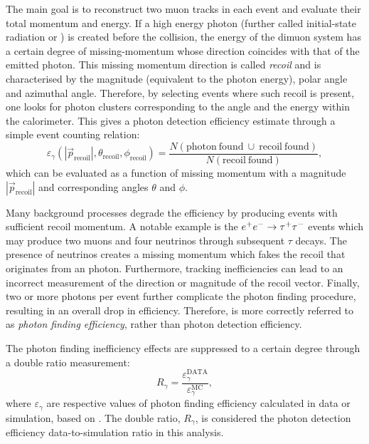 The main goal is to reconstruct two muon tracks in each event and evaluate their total momentum and energy.
If a high energy photon (further called initial-state radiation or \ISR) is created before the collision, the energy of the dimuon system has a certain degree of missing-momentum whose direction coincides with that of the emitted photon.
This missing momentum direction is called \textit{recoil} and is characterised by the magnitude (equivalent to the photon energy), polar angle and azimuthal angle.
Therefore, by selecting events where such recoil is present, one looks for photon clusters corresponding to the angle and the energy within the calorimeter.
This gives a photon detection efficiency estimate through a simple event counting relation:
\begin{equation}\label{eq:photon_efficiency}
    \varepsilon_{\gamma}(|\vec{p}_{\mathrm{recoil}}|, \theta_{\mathrm{recoil}}, \phi_{\mathrm{recoil}}) = \frac{N(\mathrm{photon~found}~\cup~\mathrm{recoil~found})}{N(\mathrm{recoil~found})},
\end{equation}
which can be evaluated as a function of missing momentum with a magnitude $|\vec{p}_{\mathrm{recoil}}|$ and corresponding angles $\theta$ and $\phi$.

Many background processes degrade the efficiency by producing events with sufficient recoil momentum.
A notable example is the $e^+e^-\rightarrow\tau^+\tau^-$ events which may produce two muons and four neutrinos through subsequent $\tau$ decays.
The presence of neutrinos creates a missing momentum which fakes the recoil that originates from an \ISR photon.
Furthermore, tracking inefficiencies can lead to an incorrect measurement of the direction or magnitude of the recoil vector.
Finally, two or more \ISR photons per event further complicate the photon finding procedure, resulting in an overall drop in efficiency.
Therefore,  is more correctly referred to as \textit{photon finding efficiency}, rather than photon detection efficiency.

The photon finding inefficiency effects are suppressed to a certain degree through a double ratio measurement:
\begin{equation}\label{eq:photon_data_mc}
    R_{\gamma} = \frac{\varepsilon_{\gamma}^{\mathrm{DATA}}}{\varepsilon_{\gamma}^{\mathrm{MC}}},
\end{equation}
where $\varepsilon_{\gamma}$ are respective values of photon finding efficiency calculated in data or simulation, based on .
The double ratio, $R_{\gamma}$, is considered the photon detection efficiency data-to-simulation ratio in this analysis.

